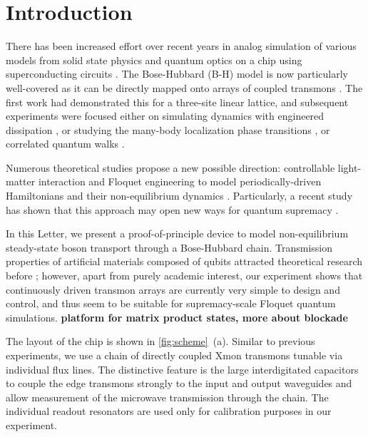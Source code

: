 \documentclass[%
 aps, pra,
 amsmath,amssymb,
 reprint,%
superscriptaddress
]{revtex4-2}
\begin{document}
\section{Introduction}


There has been increased effort over recent years in analog simulation of various models from solid state physics and quantum optics on a chip using superconducting circuits \cite{kjaergaard2019superconducting}. The Bose-Hubbard (B-H) model is now particularly well-covered as it can be directly mapped onto arrays of coupled transmons \cite{orell2019probing}. The first work \cite{hacohen2015cooling} had demonstrated this for a three-site linear lattice, and subsequent experiments were focused either on simulating dynamics with engineered dissipation \cite{ma2019dissipatively}, or studying the many-body localization phase transitions \cite{roushan2017spectroscopic,chiaro2019growth}, or correlated quantum walks \cite{Yan2019, Ye2019}.

Numerous theoretical studies propose a new possible direction: controllable light-matter interaction and Floquet engineering to model periodically-driven Hamiltonians and their non-equilibrium dynamics \cite{Goldman2014, eisert2015quantum, Zippilli2015, kyriienko2018floquet, franca2020simulating}. Particularly, a recent study has shown that this approach may open new ways for quantum supremacy \cite{tangpanitanon2019quantum}.

In this Letter, we present a proof-of-principle device to model non-equilibrium steady-state boson transport through a Bose-Hubbard chain.  Transmission properties of artificial materials composed of qubits attracted theoretical research before \cite{Zagoskin2016, viehmann2013observing, Greenberg2015, Fistul2019, Biella2015}; however, apart from purely academic interest, our experiment shows that continuously driven transmon arrays are currently very simple to design and control, and thus seem to be suitable for supremacy-scale Floquet quantum simulations. \textbf{platform for matrix product states, more about blockade}

The layout of the chip is shown in \autoref{fig:scheme}~(a). Similar to previous experiments, we use a chain of directly coupled Xmon transmons tunable via individual flux lines. The distinctive feature is the large interdigitated capacitors to couple the edge transmons strongly to the input and output waveguides and allow measurement of the microwave transmission through the chain. The individual readout resonators are used only for calibration purposes in our experiment.
\end{document}
